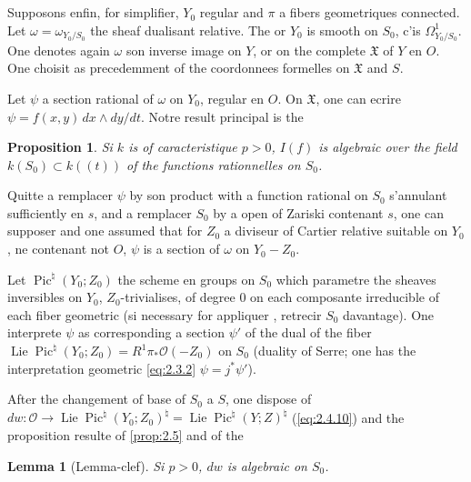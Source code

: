 \documentclass[12pt,a4paper]{article}
\theoremstyle{plain}
\newtheorem{lemma}{Lemma}
\newtheorem{proposition}{Proposition}
\theoremstyle{definition}
\theoremstyle{remark}
\DeclareMathOperator{\Lie}{Lie}
\DeclareMathOperator{\Pic}{Pic}
\newcommand{\OO}{\mathcal{O}}
\providecommand{\Lie}{\operatorname{Lie}}
\begin{document}
\subsection{}

Supposons enfin, for simplifier, $Y_0$ regular and $\pi$ a fibers geometriques
connected. Let $\omega=\omega_{Y_0/S_0}$ the sheaf dualisant relative. The or $Y_0$ is smooth on
$S_0$, c'is $\Omega^1_{Y_0/S_0}$. One denotes again $\omega$ son inverse image on $Y$, or on the complete
$\mathfrak{X}$ of $Y$ en $O$. One choisit as precedemment of the coordonnees formelles on
$\mathfrak{X}$ and $S$.

Let $\psi$ a section rational of $\omega$ on $Y_0$, regular en $O$. On
$\mathfrak{X}$, one can ecrire $\psi=f(x,y)\,dx\wedge dy/dt$. Notre result principal is the

\begin{proposition}\label{prop:3.2}
Si $k$ is of caracteristique $p>0$, $I(f)$ is algebraic over the field
$k(S_0)\subset k((t))$ of the functions rationnelles on $S_0$.
\end{proposition}

Quitte a remplacer $\psi$ by son product with a function rational on $S_0$
s'annulant sufficiently en $s$, and a remplacer $S_0$ by a open of Zariski
contenant $s$, one can supposer and one assumed that for $Z_0$ a diviseur of
Cartier relative suitable on $Y_0$, ne contenant not $O$, $\psi$ is a section of
$\omega$ on $Y_0-Z_0$.

Let $\Pic^\natural(Y_0;Z_0)$ the scheme en groups on $S_0$ which parametre the
sheaves inversibles on $Y_0$, $Z_0$-trivialises, of degree $0$ on each composante
irreducible of each fiber geometric (si necessary for appliquer
\cite{Raynaud1}, retrecir $S_0$ davantage). One interprete $\psi$ as corresponding
a section $\psi'$ of the dual of the fiber
$\Lie\Pic^\natural(Y_0;Z_0)=R^1\pi_*\OO(-Z_0)$
on $S_0$ (duality of Serre; one has the interpretation geometric \eqref{eq:2.3.2}
$\psi=j^*\psi'$).

After the changement of base of $S_0$ a $S$, one dispose of $dw:\OO\to\Lie\Pic^\natural(Y_0;Z_0)^\natural=\Lie\Pic^\natural(Y;Z)^\natural$ (\eqref{eq:2.4.10}) and the proposition resulte of \ref{prop:2.5} and of the

\begin{lemma}[Lemma-clef]\label{lem:3.3}
Si $p>0$, $dw$ is algebraic on $S_0$.
\end{lemma}
\end{document}

